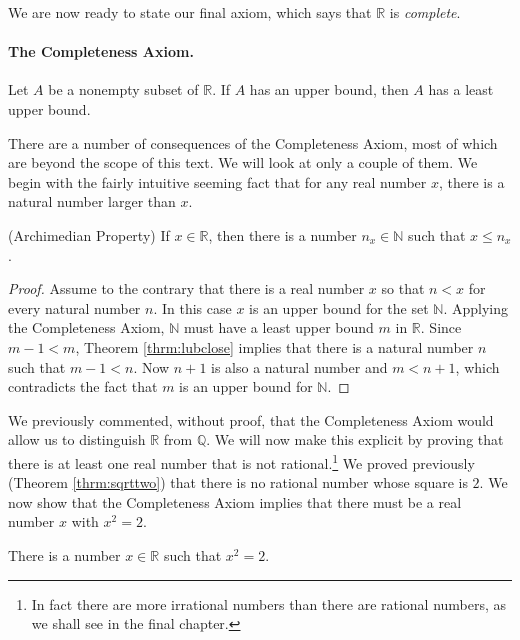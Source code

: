 We are now ready to state our final axiom, which says that $\mathbb R$ is \emph{complete}.

\paragraph{The Completeness Axiom.} Let $A$ be a nonempty subset of $\mathbb R$. If $A$ has an upper bound, then $A$ has a least upper bound.

\smallbreak
There are a number of consequences of the Completeness Axiom, most of which are beyond the scope of this text. We will look at only a couple of them. We begin with the fairly intuitive seeming fact that for any real number $x$, there is a natural number larger than $x$.

\begin{thrm}
(Archimedian Property) If $x\in\mathbb R$, then there is a number $n_x \in\mathbb N$ such that $x\leq n_x$.
\end{thrm}

\begin{proof}
Assume to the contrary that there is a real number $x$ so that $n<x$ for every natural number $n$. In this case $x$ is an upper bound for the set $\mathbb N$. Applying the Completeness Axiom, $\mathbb N$ must have a least upper bound $m$ in $\mathbb R$. Since $m-1<m$, Theorem \ref{thrm:lubclose} implies that there is a natural number $n$ such that $m-1<n$. Now $n+1$ is also a natural number and $m<n+1$, which contradicts the fact that $m$ is an upper bound for $\mathbb N$.
\end{proof}

We previously commented, without proof, that the Completeness Axiom would allow us to distinguish $\mathbb R$ from $\mathbb Q$. We will now make this explicit by proving that there is at least one real number that is not rational.\footnote{In fact there are more irrational numbers than there are rational numbers, as we shall see in the final chapter.} We proved previously (Theorem \ref{thrm:sqrttwo}) that there is no rational number whose square is $2$. We now show that the Completeness Axiom implies that there must be a real number $x$ with $x^2=2$.

\begin{thrm}\label{thrm:realsqrttwo}
There is a number $x\in\mathbb R$ such that $x^2=2$. 
\end{thrm}

